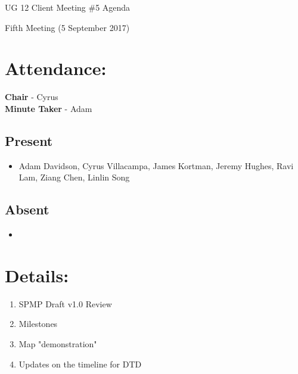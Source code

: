\documentclass{article}
\begin{document}
\begin{adjustwidth}{2.5em}{0pt}
\begin{center}
\Large{UG 12 Client Meeting \#5 Agenda}\\
\end{center}
\end{adjustwidth}

Fifth Meeting (5 September 2017)
\section{Attendance:}
\textbf{Chair} - Cyrus\\
\textbf{Minute Taker} - Adam\\
\subsection*{Present}
\begin{itemize}
\item Adam Davidson, Cyrus Villacampa, James Kortman, Jeremy Hughes, Ravi Lam, Ziang Chen, Linlin Song
\end{itemize}
\subsection*{Absent}
\begin{itemize}
\item  
\end {itemize}

\section{Details:}
\begin{enumerate}
\item SPMP Draft v1.0 Review
\item Milestones
\item Map "demonstration"
\item Updates on the timeline for DTD
\end{enumerate}
\end{document}
